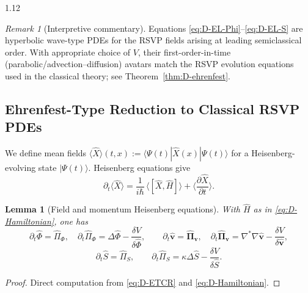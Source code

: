 \documentclass[12pt,a4paper]{article}
\numberwithin{equation}{section}
\newtheorem{lemma}{Lemma}[section]
\theoremstyle{remark}
\newtheorem{remark}{Remark}[section]
\theoremstyle{definition}
\begin{document}
\begin{spacing}{1.12}
\begin{remark}[Interpretive commentary]
Equations \eqref{eq:D-EL-Phi}--\eqref{eq:D-EL-S} are hyperbolic wave-type PDEs for the RSVP fields arising at leading semiclassical order. With appropriate choice of $V$, their first-order-in-time (parabolic/advection--diffusion) avatars match the RSVP evolution equations used in the classical theory; see Theorem~\ref{thm:D-ehrenfest}.
\end{remark}

\subsection{Ehrenfest-Type Reduction to Classical RSVP PDEs}\label{sec:D-ehrenfest}

We define mean fields $\langle \hat{X}\rangle(t,x):=\langle\Psi(t)|\hat{X}(x)|\Psi(t)\rangle$ for a Heisenberg-evolving state $|\Psi(t)\rangle$. Heisenberg equations give
\begin{equation}\label{eq:D-Heis}
\partial_t \langle \hat{X}\rangle
=\frac{1}{i\hbar}\,\langle[\hat{X},\hat{H}]\rangle
+\Big\langle\frac{\partial \hat{X}}{\partial t}\Big\rangle.
\end{equation}

\begin{lemma}[Field and momentum Heisenberg equations]\label{lem:D-Heis}
With $\hat{H}$ as in \eqref{eq:D-Hamiltonian}, one has
\[
\partial_t \hat{\Phi}=\hat{\Pi}_\Phi,\quad
\partial_t \hat{\Pi}_\Phi=\Delta \hat{\Phi}-\frac{\delta V}{\delta \hat{\Phi}},\qquad
\partial_t \hat{\mathbf{v}}=\hat{\bm{\Pi}}_{\!\mathbf{v}},\quad
\partial_t \hat{\bm{\Pi}}_{\!\mathbf{v}}=\nabla^\ast\nabla \hat{\mathbf{v}}-\frac{\delta V}{\delta \hat{\mathbf{v}}},
\]
\[
\partial_t \hat{S}=\hat{\Pi}_S,\qquad
\partial_t \hat{\Pi}_S=\kappa \Delta \hat{S}-\frac{\delta V}{\delta \hat{S}}.
\]
\end{lemma}

\begin{proof}
Direct computation from \eqref{eq:D-ETCR} and \eqref{eq:D-Hamiltonian}.
\end{proof}


\end{spacing}
\end{document}
